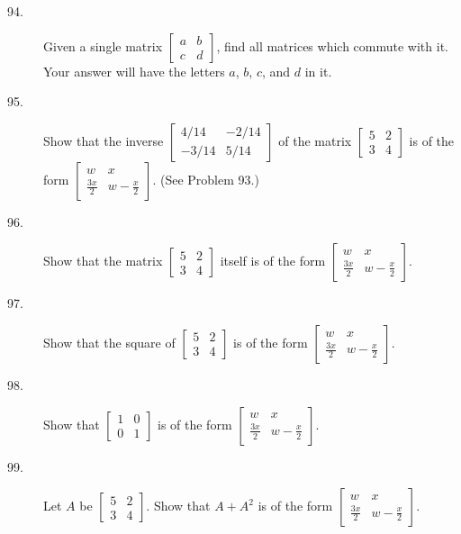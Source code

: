 \documentclass{article}
\begin{document}
\begin{description}
  \item[94.] Given a single matrix $\begin{bmatrix} a & b \\ c & d \end{bmatrix}$, find all matrices which commute with it. Your answer will have the letters $a$, $b$, $c$, and $d$ in it.

  \item[95.] Show that the inverse $\begin{bmatrix} 4/14 & -2/14 \\ -3/14 & 5/14 \end{bmatrix}$ of the matrix $\begin{bmatrix} 5 & 2 \\ 3 & 4 \end{bmatrix}$ is of the form $\begin{bmatrix} w & x \\ \frac{3x}{2} & w-\frac{x}{2} \end{bmatrix}$. (See Problem 93.)

  \item[96.] Show that the matrix $\begin{bmatrix} 5 & 2 \\ 3 & 4 \end{bmatrix}$ itself is of the form $\begin{bmatrix} w & x \\ \frac{3x}{2} & w-\frac{x}{2} \end{bmatrix}$.

  \item[97.] Show that the square of $\begin{bmatrix} 5 & 2 \\ 3 & 4 \end{bmatrix}$ is of the form $\begin{bmatrix} w & x \\ \frac{3x}{2} & w-\frac{x}{2} \end{bmatrix}$.

  \item[98.] Show that $\begin{bmatrix} 1 & 0 \\ 0 & 1 \end{bmatrix}$ is of the form $\begin{bmatrix} w & x \\ \frac{3x}{2} & w-\frac{x}{2} \end{bmatrix}$.

  \item[99.] Let $A$ be $\begin{bmatrix} 5 & 2 \\ 3 & 4 \end{bmatrix}$. Show that $A + A^2$ is of the form $\begin{bmatrix} w & x \\ \frac{3x}{2} & w-\frac{x}{2} \end{bmatrix}$.


\end{description}
\end{document}
